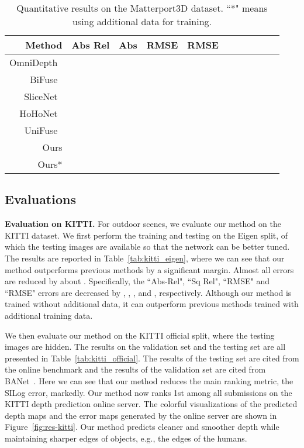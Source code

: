 \documentclass[10pt,twocolumn,letterpaper]{article}
\begin{document}
\setlength{\tabcolsep}{4pt}
\begin{table*}[]
\small
\centering
\begin{tabular}{r c c c c c c c c c c}
\toprule
Method & Abs Rel  & Abs  & RMSE  & RMSE  &   &   &    \\
\midrule
OmniDepth~\cite{zioulis2018omnidepth} &  &  &  &  &  &  & \\
BiFuse~\cite{wang2020bifuse} &  &  &  &  &  &  & \\
SliceNet~\cite{pintore2021slicenet} &  &  &  &  &  &  & \\
HoHoNet~\cite{sun2021hohonet} &  &  &  &  &  &  & \\
UniFuse~\cite{jiang2021unifuse} &  &  &  &  &  &  & \\
Ours &  &  &  &  &  &  & \\
\midrule
Ours* &  &  &  &  &  &  & \\
\bottomrule
\end{tabular}
\vspace{-2mm}
\caption{Quantitative results on the Matterport3D dataset. ``*" means using additional data for training.}
\label{tab:matterport}
\vspace{-5mm}
\end{table*}
\setlength{\tabcolsep}{4pt}













\subsection{Evaluations}

\textbf{Evaluation on KITTI. }
For outdoor scenes, we evaluate our method on the KITTI dataset. 
We first perform the training and testing on the Eigen split, of which the testing images are available so that the network can be better tuned.
The results are reported in Table~\ref{tab:kitti_eigen}, where we can see that our method outperforms previous methods by a significant margin. 
Almost all errors are reduced by about . 
Specifically, the ``Abs-Rel", ``Sq Rel", ``RMSE" and ``RMSE" errors are decreased by , , , and , respectively.
Although our method is trained without additional data, it can outperform previous methods trained with additional training data.

We then evaluate our method on the KITTI official split, where the testing images are hidden. The results on the validation set and the testing set are all presented in Table~\ref{tab:kitti_official}. The results of the testing set are cited from the online benchmark and the results of the validation set are cited from BANet~\cite{aich2020bidirectional}.
Here we can see that our method reduces the main ranking metric, the SILog error, markedly. 
Our method now ranks 1st among all submissions on the KITTI depth prediction online server.
The colorful visualizations of the predicted depth maps and the error maps generated by the online server are shown in Figure~\ref{fig:res-kitti}. Our method predicts cleaner and smoother depth while maintaining sharper edges of objects, e.g., the edges of the humans.
\end{document}
